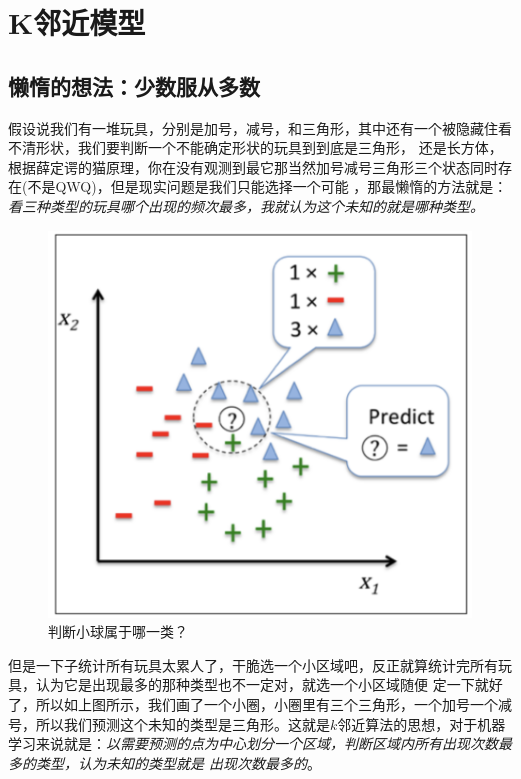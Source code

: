 \chapter{K邻近模型}

\section{懒惰的想法：少数服从多数}

假设说我们有一堆玩具，分别是加号，减号，和三角形，其中还有一个被隐藏住看不清形状，我们要判断一个不能确定形状的玩具到到底是三角形，
还是长方体，根据薛定谔的猫原理，你在没有观测到最它那当然加号减号三角形三个状态同时存在(不是QWQ)，但是现实问题是我们只能选择一个可能
，那最懒惰的方法就是：\textsl{看三种类型的玩具哪个出现的频次最多，我就认为这个未知的就是哪种类型。}

\begin{figure}[H]
    \centering
    \includegraphics[scale=0.2]{figures/k-nearest.png}
    \caption{判断小球属于哪一类？}
\end{figure}

但是一下子统计所有玩具太累人了，干脆选一个小区域吧，反正就算统计完所有玩具，认为它是出现最多的那种类型也不一定对，就选一个小区域随便
定一下就好了，所以如上图所示，我们画了一个小圈，小圈里有三个三角形，一个加号一个减号，所以我们预测这个未知的类型是三角形。这就是$k
$邻近算法的思想，对于机器学习来说就是：\textsl{以需要预测的点为中心划分一个区域，判断区域内所有出现次数最多的类型，认为未知的类型就是
出现次数最多的}。
